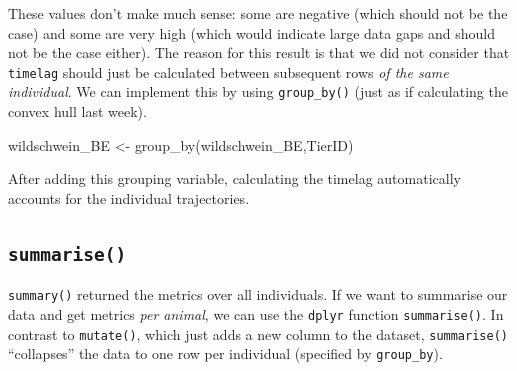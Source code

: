 \documentclass[
]{book}
\newenvironment{Shaded}{\begin{snugshade}}{\end{snugshade}}
\newcommand{\AttributeTok}[1]{\textcolor[rgb]{0.77,0.63,0.00}{#1}}
\newcommand{\DocumentationTok}[1]{\textcolor[rgb]{0.56,0.35,0.01}{\textbf{\textit{#1}}}}
\newcommand{\FunctionTok}[1]{\textcolor[rgb]{0.00,0.00,0.00}{#1}}
\newcommand{\NormalTok}[1]{#1}
\newcommand{\OtherTok}[1]{\textcolor[rgb]{0.56,0.35,0.01}{#1}}
\newcommand{\SpecialCharTok}[1]{\textcolor[rgb]{0.00,0.00,0.00}{#1}}
\newcommand{\StringTok}[1]{\textcolor[rgb]{0.31,0.60,0.02}{#1}}
\begin{document}
These values don't make much sense: some are negative (which should not be the case) and some are very high (which would indicate large data gaps and should not be the case either). The reason for this result is that we did not consider that \texttt{timelag} should just be calculated between subsequent rows \emph{of the same individual}. We can implement this by using \texttt{group\_by()} (just as if calculating the convex hull last week).

\begin{Shaded}
\begin{Highlighting}[]
\NormalTok{wildschwein\_BE }\OtherTok{\textless{}{-}} \FunctionTok{group\_by}\NormalTok{(wildschwein\_BE,TierID)}
\end{Highlighting}
\end{Shaded}

After adding this grouping variable, calculating the timelag automatically accounts for the individual trajectories.

\begin{Shaded}
\end{Shaded}

\hypertarget{summarise}{%
\subsection{\texorpdfstring{\texttt{summarise()}}{summarise()}}\label{summarise}}

\texttt{summary()} returned the metrics over all individuals. If we want to summarise our data and get metrics \emph{per animal}, we can use the \texttt{dplyr} function \texttt{summarise()}. In contrast to \texttt{mutate()}, which just adds a new column to the dataset, \texttt{summarise()} ``collapses'' the data to one row per individual (specified by \texttt{group\_by}).
\end{document}

